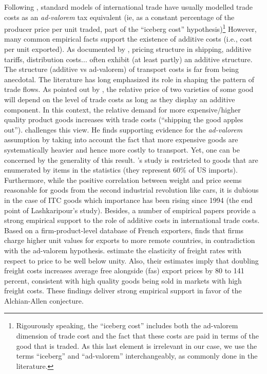 \documentclass[a4paper,11pt]{article}
\begin{document}
Following \citet{samuelson1954}, standard models of international trade have usually modelled trade costs as an \emph{ad-valorem} tax equivalent (ie, as a constant percentage of the producer price per unit traded, part of the ``iceberg cost'' hypothesis)\footnote{Rigourously speaking, the ``iceberg cost'' includes both the ad-valorem dimension of trade cost and the fact that these costs are paid in terms of the good that is traded. As this last element is irrelevant in our case, we use the terms ``iceberg'' and ``ad-valorem'' interchangeably, as commonly done in the literature.} However, many common empirical facts support the existence of additive costs (i.e., cost per unit exported). As documented by \citet{Irrazabal_2015}, pricing structure in shipping, additive tariffs, distribution costs... often exhibit (at least partly) an additive structure. The structure (additive vs ad-valorem) of transport costs is far from being anecdotal. The literature has long emphasized its role in shaping the pattern of trade flows. As pointed out by \cite{alchian}, the relative price of two varieties of some good will depend on the level of trade costs as long as they display an additive component. In this context, the relative demand for more expensive/higher quality product goods increases with trade costs (``shipping the good apples out''). \citet{Lashkaripour-mimeo-2017} challenges this view. He finds supporting evidence for the \emph{ad-valorem} assumption by taking into account the fact that more expensive goods are systematically heavier and hence more costly to transport. Yet, one can be concerned by the generality of this result. \citet{Lashkaripour-mimeo-2017}'s study is restricted to goods that are enumerated by items in the statistics (they represent 60\% of US imports). Furthermore, while the positive correlation between weight and price seems reasonable for goods from the second industrial revolution like cars, it is dubious in the case of ITC goods which importance has been rising since 1994 (the end point of Lashkaripour's study). Besides, a number of empirical papers provide a strong empirical support to the role of additive costs in international trade costs. Based on a firm-product-level database of French exporters, \citet{martin2012} finds that firms charge higher unit values for exports to more remote countries, in contradiction with the ad-valorem hypothesis. \citet{hummels_skiba} estimate the elasticity of freight rates with respect to price to be well below unity. Also, their estimates imply that doubling freight costs increases average free alongside (fas) export prices by 80 to 141 percent, consistent with high quality goods being sold in markets with high freight costs. These findings deliver strong empirical support in favor of the Alchian-Allen conjecture.
\smallskip
\end{document}

